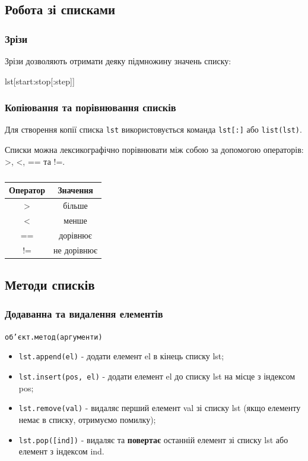 \subsection{Робота зі списками} 
\begin{frame}
\frametitle{Зрізи}
Зрізи дозволяють отримати деяку підмножину значень списку:
\vspace{1cm}
\begin{center}
\huge{lst[start:stop[:step]]}
\end{center}
\normalsize

\end{frame}


\begin{frame}
\frametitle{Копіювання та порівнювання списків}
Для створення копії списка \texttt{lst} використовується команда \texttt{lst[:]} або \texttt{list(lst)}.

Списки можна лексикографічно порівнювати між собою за допомогою операторів: >, <, == та !=.
\begin{table}
  \caption{}
  \label{tab:}

  \begin{center}
    \begin{tabular}{|c|c|}
    \hline
      \textbf{Оператор} & \textbf{Значення} \\
      \hline
      > & більше \\
      \hline
      < & менше\\
      \hline
      == & дорівнює \\
      \hline
      != & не дорівнює\\
      \hline
    \end{tabular}
  \end{center}
\end{table}
\end{frame}

\subsection{Методи списків} 

\begin{frame}
\frametitle{Додаванна та видалення елементів}
\begin{center}
\texttt{об'єкт.метод(аргументи)}
\end{center}
\begin{itemize}
        \item<1-> \texttt{lst.append(el)} - додати елемент el в кінець списку lst;
        \item<2-> \texttt{lst.insert(pos, el)} - додати елемент el до списку lst на місце з індексом pos;
        \item<3-> \texttt{lst.remove(val)} - видаляє перший елемент val зі списку lst (якщо елементу немає в списку, отримуємо помилку);
        \item<4-> \texttt{lst.pop([ind])} - видаляє та \textbf{повертає} останній елемент зі списку lst або елемент з індексом ind.
    \end{itemize}
\end{frame}



